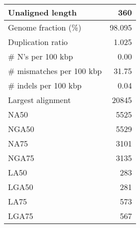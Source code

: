 \documentclass[12pt,a4paper]{article}
\begin{document}
\begin{table}[ht]
\begin{center}
\begin{tabular}{|l*{1}{|r}|}
Unaligned length & 360 \\ \hline
Genome fraction (\%) & 98.095 \\ \hline
Duplication ratio & 1.025 \\ \hline
\# N's per 100 kbp & 0.00 \\ \hline
\# mismatches per 100 kbp & 31.75 \\ \hline
\# indels per 100 kbp & 0.04 \\ \hline
Largest alignment & 20845 \\ \hline
NA50 & 5525 \\ \hline
NGA50 & 5529 \\ \hline
NA75 & 3101 \\ \hline
NGA75 & 3135 \\ \hline
LA50 & 283 \\ \hline
LGA50 & 281 \\ \hline
LA75 & 573 \\ \hline
LGA75 & 567 \\ \hline
\end{tabular}
\end{center}
\end{table}
\end{document}
